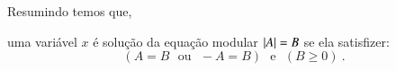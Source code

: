  Resumindo temos que,

  \vskip0.3cm
 \colorbox{rosa}{
 \begin{minipage}{0.9\linewidth}
 \begin{center}
   uma variável $x$ é solução da equação modular $\left|A\right|= B$ se ela satisfizer:
 \[(A= B \ \ \ \text{ou} \ \ \ -A= B) \ \ \ \text{e} \ \ \ (B \geq 0) \ . \]
 \end{center}
 \end{minipage}}
 \vskip0.3cm
